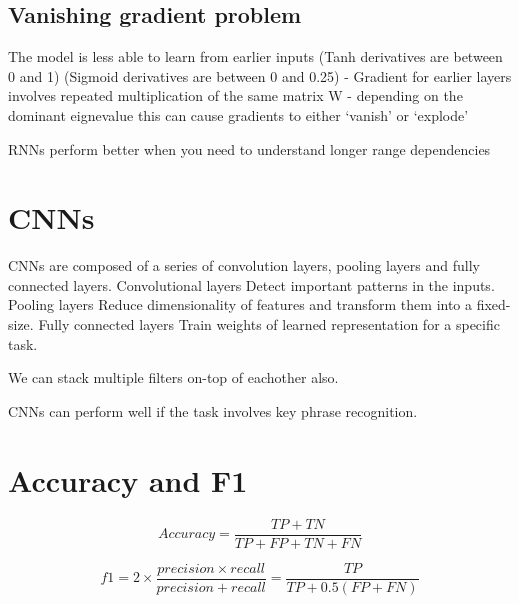 \documentclass[11pt]{article}
\begin{document}
\subsection{Vanishing gradient problem}

The model is less able to learn from earlier inputs (Tanh derivatives are between 0 and 1) (Sigmoid derivatives are between 0 and 0.25) - Gradient for earlier layers involves repeated multiplication
of the same matrix W - depending on the dominant eignevalue this can cause gradients to either `vanish' or `explode'

\begin{warning}
    RNNs perform better when you need to understand longer range dependencies
\end{warning}

\section{CNNs}

CNNs are composed of a series of convolution layers,
pooling layers and fully connected layers. Convolutional layers Detect important patterns in the inputs. Pooling layers Reduce dimensionality of features and transform them into a fixed-size. Fully connected layers Train weights of learned representation for a specific task.

We can stack multiple filters on-top of eachother also.

\begin{warning}
    CNNs can perform well if the task involves key phrase recognition.
\end{warning}

\section{Accuracy and F1}

\begin{definition}[accuracy]
    \begin{equation*}
        Accuracy = \frac{TP + TN}{TP +FP + TN + FN}
    \end{equation*}
\end{definition}

\begin{definition}[f1-measure]
    \begin{equation*}
        f1 = 2 \times \frac{precision\times recall}{precision + recall} = \frac{TP}{TP + 0.5 (FP +FN)}
    \end{equation*}
\end{definition}
\end{document}
